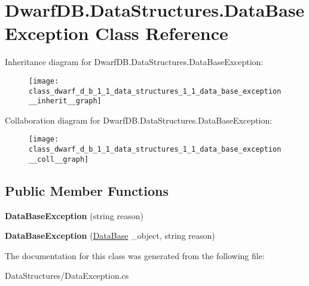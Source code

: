 \hypertarget{class_dwarf_d_b_1_1_data_structures_1_1_data_base_exception}{
\section{DwarfDB.DataStructures.DataBaseException Class Reference}
\label{class_dwarf_d_b_1_1_data_structures_1_1_data_base_exception}
}


Inheritance diagram for DwarfDB.DataStructures.DataBaseException:
\nopagebreak
\begin{figure}[H]
\begin{center}
\leavevmode
\texttt{[image: class\_dwarf\_d\_b\_1\_1\_data\_structures\_1\_1\_data\_base\_exception\_\_inherit\_\_graph]}
\end{center}
\end{figure}


Collaboration diagram for DwarfDB.DataStructures.DataBaseException:
\nopagebreak
\begin{figure}[H]
\begin{center}
\leavevmode
\texttt{[image: class\_dwarf\_d\_b\_1\_1\_data\_structures\_1\_1\_data\_base\_exception\_\_coll\_\_graph]}
\end{center}
\end{figure}
\subsection*{Public Member Functions}
\begin{DoxyCompactItemize}
\item 
\hypertarget{class_dwarf_d_b_1_1_data_structures_1_1_data_base_exception_ac31189f613083b06927c5b7b62a5415a}{
{\bfseries DataBaseException} (string reason)}
\label{class_dwarf_d_b_1_1_data_structures_1_1_data_base_exception_ac31189f613083b06927c5b7b62a5415a}

\item 
\hypertarget{class_dwarf_d_b_1_1_data_structures_1_1_data_base_exception_a92e1a400cd2702fd38385c374478981e}{
{\bfseries DataBaseException} (\hyperlink{class_dwarf_d_b_1_1_data_structures_1_1_data_base}{DataBase} \_\-object, string reason)}
\label{class_dwarf_d_b_1_1_data_structures_1_1_data_base_exception_a92e1a400cd2702fd38385c374478981e}

\end{DoxyCompactItemize}


The documentation for this class was generated from the following file:\begin{DoxyCompactItemize}
\item 
DataStructures/DataException.cs\end{DoxyCompactItemize}
